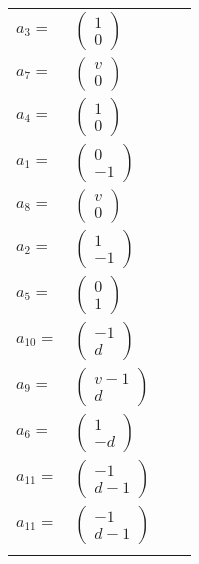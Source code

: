 \documentclass[1p]{elsarticle_modified}
\theoremstyle{definition}
\begin{document}
\begin{tabular}{m{7pt} m{180pt} m{7pt} m{180pt} }
\flushright $a_{3}=$&$\begin{pmatrix}1\\0\end{pmatrix}$ \\
\flushright $a_{7}=$&$\begin{pmatrix}v\\0\end{pmatrix}$ \\
\flushright $a_{4}=$&$\begin{pmatrix}1\\0\end{pmatrix}$ \\
\flushright $a_{1}=$&$\begin{pmatrix}0\\-1\end{pmatrix}$ \\
\flushright $a_{8}=$&$\begin{pmatrix}v\\0\end{pmatrix}$ \\
\flushright $a_{2}=$&$\begin{pmatrix}1\\-1\end{pmatrix}$ \\
\flushright $a_{5}=$&$\begin{pmatrix}0\\1\end{pmatrix}$ \\
\flushright $a_{10}=$&$\begin{pmatrix}-1\\d\end{pmatrix}$ \\
\flushright $a_{9}=$&$\begin{pmatrix}v-1\\d\end{pmatrix}$ \\
\flushright $a_{6}=$&$\begin{pmatrix}1\\- d\end{pmatrix}$ \\
\flushright $a_{11}=$&$\begin{pmatrix}-1\\d-1\end{pmatrix}$\\ \flushright $a_{11}=$&$\begin{pmatrix}-1\\d-1\end{pmatrix}$\\&\end{tabular}
\end{document}
